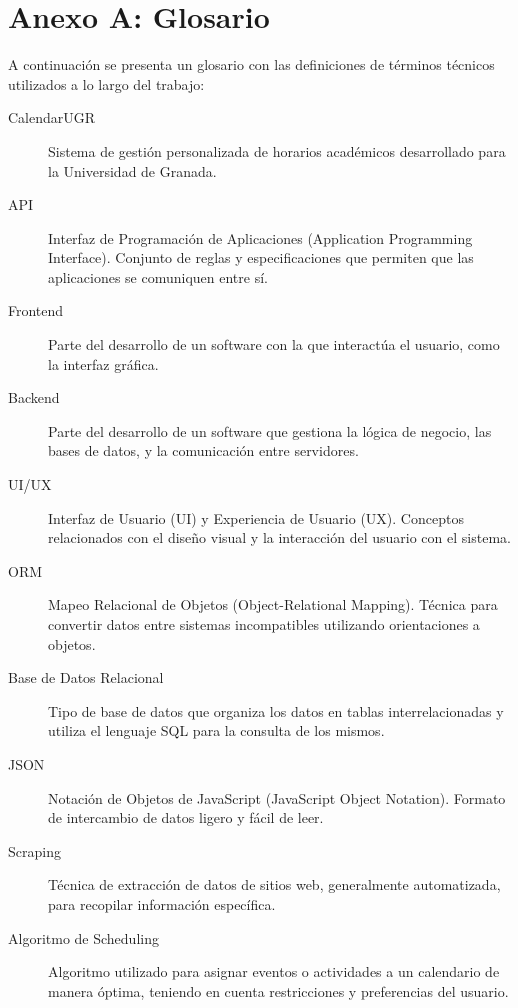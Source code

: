 \chapter*{Anexo A: Glosario}

A continuación se presenta un glosario con las definiciones de términos técnicos utilizados a lo largo del trabajo:

\begin{description}
    \item[\hypertarget{calendarUGR}{CalendarUGR}] Sistema de gestión personalizada de horarios académicos desarrollado para la Universidad de Granada.
    \item[\hypertarget{api}{API}] Interfaz de Programación de Aplicaciones (Application Programming Interface). Conjunto de reglas y especificaciones que permiten que las aplicaciones se comuniquen entre sí.
    \item[\hypertarget{frontend}{Frontend}] Parte del desarrollo de un software con la que interactúa el usuario, como la interfaz gráfica.
    \item[\hypertarget{backend}{Backend}] Parte del desarrollo de un software que gestiona la lógica de negocio, las bases de datos, y la comunicación entre servidores.
    \item[\hypertarget{uiux}{UI/UX}] Interfaz de Usuario (UI) y Experiencia de Usuario (UX). Conceptos relacionados con el diseño visual y la interacción del usuario con el sistema.
    \item[\hypertarget{orm}{ORM}] Mapeo Relacional de Objetos (Object-Relational Mapping). Técnica para convertir datos entre sistemas incompatibles utilizando orientaciones a objetos.
    \item[\hypertarget{basededatos}{Base de Datos Relacional}] Tipo de base de datos que organiza los datos en tablas interrelacionadas y utiliza el lenguaje SQL para la consulta de los mismos.
    \item[\hypertarget{json}{JSON}] Notación de Objetos de JavaScript (JavaScript Object Notation). Formato de intercambio de datos ligero y fácil de leer.
    \item[\hypertarget{scraping}{Scraping}] Técnica de extracción de datos de sitios web, generalmente automatizada, para recopilar información específica.
    \item[\hypertarget{scheduling}{Algoritmo de Scheduling}] Algoritmo utilizado para asignar eventos o actividades a un calendario de manera óptima, teniendo en cuenta restricciones y preferencias del usuario.

\end{description}

